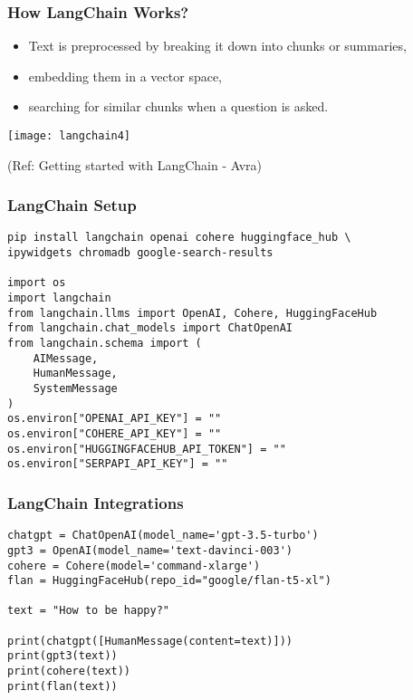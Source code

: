 \begin{frame}\frametitle{How LangChain Works?}

\begin{itemize}
\item Text is preprocessed by breaking it down into chunks or summaries, 
\item embedding them in a vector space, 
\item searching for similar chunks when a question is asked. 
\end{itemize}

\begin{center}
\texttt{[image: langchain4]}
\end{center}	  


{\tiny (Ref: Getting started with LangChain - Avra)}
\end{frame}

\begin{frame}[fragile]\frametitle{LangChain Setup}

\begin{lstlisting}
pip install langchain openai cohere huggingface_hub \
ipywidgets chromadb google-search-results

import os
import langchain
from langchain.llms import OpenAI, Cohere, HuggingFaceHub
from langchain.chat_models import ChatOpenAI
from langchain.schema import (
    AIMessage,
    HumanMessage,
    SystemMessage
)
os.environ["OPENAI_API_KEY"] = ""
os.environ["COHERE_API_KEY"] = ""
os.environ["HUGGINGFACEHUB_API_TOKEN"] = ""
os.environ["SERPAPI_API_KEY"] = ""
\end{lstlisting}	  

\end{frame}

\begin{frame}[fragile]\frametitle{LangChain Integrations}

\begin{lstlisting}
chatgpt = ChatOpenAI(model_name='gpt-3.5-turbo')
gpt3 = OpenAI(model_name='text-davinci-003')
cohere = Cohere(model='command-xlarge')
flan = HuggingFaceHub(repo_id="google/flan-t5-xl")

text = "How to be happy?"

print(chatgpt([HumanMessage(content=text)]))
print(gpt3(text))
print(cohere(text))
print(flan(text))
\end{lstlisting}	  

\end{frame}

